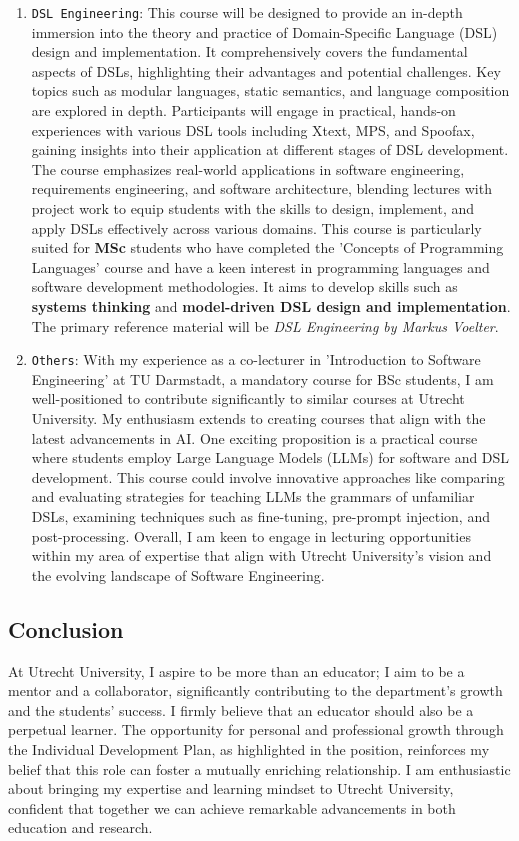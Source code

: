 \documentclass[12pt,a4paper,sans]{moderncv}
\begin{document}
\begin{enumerate}
    \item \texttt{DSL Engineering}: This course will be designed to provide an in-depth immersion into the theory and practice of Domain-Specific Language (DSL) design and implementation. It comprehensively covers the fundamental aspects of DSLs, highlighting their advantages and potential challenges. Key topics such as modular languages, static semantics, and language composition are explored in depth. Participants will engage in practical, hands-on experiences with various DSL tools including Xtext, MPS, and Spoofax, gaining insights into their application at different stages of DSL development. The course emphasizes real-world applications in software engineering, requirements engineering, and software architecture, blending lectures with project work to equip students with the skills to design, implement, and apply DSLs effectively across various domains. This course is particularly suited for \textbf{MSc} students who have completed the 'Concepts of Programming Languages' course and have a keen interest in programming languages and software development methodologies. It aims to develop skills such as \textbf{systems thinking} and \textbf{model-driven DSL design and implementation}. The primary reference material will be \textit{DSL Engineering by Markus Voelter}.
    \item \texttt{Others}: With my experience as a co-lecturer in 'Introduction to Software Engineering' at TU Darmstadt, a mandatory course for BSc students, I am well-positioned to contribute significantly to similar courses at Utrecht University. My enthusiasm extends to creating courses that align with the latest advancements in AI. One exciting proposition is a practical course where students employ Large Language Models (LLMs) for software and DSL development. This course could involve innovative approaches like comparing and evaluating strategies for teaching LLMs the grammars of unfamiliar DSLs, examining techniques such as fine-tuning, pre-prompt injection, and post-processing. Overall, I am keen to engage in lecturing opportunities within my area of expertise that align with Utrecht University's vision and the evolving landscape of Software Engineering.
\end{enumerate}

\subsection*{Conclusion}

At Utrecht University, I aspire to be more than an educator; I aim to be a mentor and a collaborator, significantly contributing to the department's growth and the students' success. I firmly believe that an educator should also be a perpetual learner. The opportunity for personal and professional growth through the Individual Development Plan, as highlighted in the position, reinforces my belief that this role can foster a mutually enriching relationship. I am enthusiastic about bringing my expertise and learning mindset to Utrecht University, confident that together we can achieve remarkable advancements in both education and research.
\end{document}
